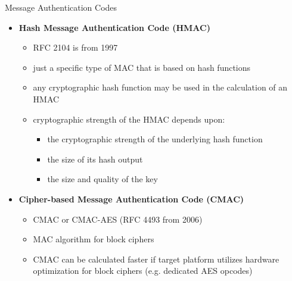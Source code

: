 \documentclass[pdf]{beamer}
\begin{document}
\begin{frame}{Message Authentication Codes}
\begin{itemize}
\item
\textbf{Hash Message Authentication Code (HMAC)}
\begin{itemize}
\item
RFC 2104 is from 1997
\item
just a specific type of MAC that is based on hash functions
\item
any cryptographic hash function may be used in the calculation of an HMAC
\item
cryptographic strength of the HMAC depends upon:
\begin{itemize}
\item
the cryptographic strength of the underlying hash function
\item
the size of its hash output
\item
the size and quality of the key
\end{itemize}
\end{itemize}

\item
\textbf{Cipher-based Message Authentication Code (CMAC)}
\begin{itemize}
\item
CMAC or CMAC-AES (RFC 4493 from 2006)
\item
MAC algorithm for block ciphers
\item
CMAC can be calculated faster if target platform utilizes hardware optimization for block ciphers (e.g. dedicated AES opcodes)
\end{itemize}
\end{itemize}
\end{frame}
\end{document}
